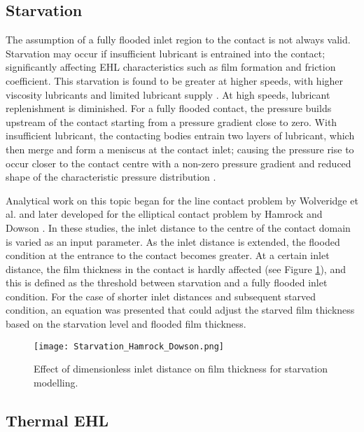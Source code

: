 \subsection{Starvation}

The assumption of a fully flooded inlet region to the contact is not always valid. Starvation may occur if insufficient lubricant is entrained into the contact; significantly affecting EHL characteristics such as film formation and friction coefficient. This starvation is found to be greater at higher speeds, with higher viscosity lubricants and limited lubricant supply \cite{Chevalier1995}. At high speeds, lubricant replenishment is diminished. For a fully flooded contact, the pressure builds upstream of the contact starting from a pressure gradient close to zero. With insufficient lubricant, the contacting bodies entrain two layers of lubricant, which then merge and form a meniscus at the contact inlet; causing the pressure rise to occur closer to the contact centre with a non-zero pressure gradient and reduced shape of the characteristic pressure distribution \cite{Lugt2011}.

Analytical work on this topic began for the line contact problem by Wolveridge et al. \cite{Wolveridge1970a} and later developed for the elliptical contact problem by Hamrock and Dowson \cite{Hamrock1976}. In these studies, the inlet distance to the centre of the contact domain is varied as an input parameter. As the inlet distance is extended, the flooded condition at the entrance to the contact becomes greater. At a certain inlet distance, the film thickness in the contact is hardly affected (see Figure \ref{Starvation_Hamrock_Dowson}), and this is defined as the threshold between starvation and a fully flooded inlet condition. For the case of shorter inlet distances and subsequent starved condition, an equation was presented that could adjust the starved film thickness based on the starvation level and flooded film thickness.

\begin{figure}
	\centerline{\texttt{[image: Starvation\_Hamrock\_Dowson.png]}}
	\caption [Effect of dimensionless inlet distance on film thickness for starvation modelling.]{Effect of dimensionless inlet distance on film thickness for starvation modelling. \cite{Hamrock1976}}
	\label{Starvation_Hamrock_Dowson}
\end{figure}

\subsection{Thermal EHL}


